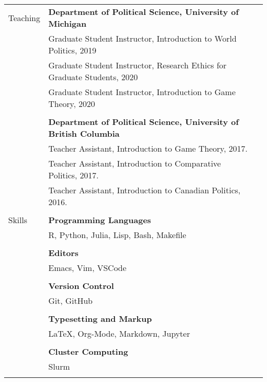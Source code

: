 \documentclass[letterpaper,11pt,oneside]{article}
\begin{document}
\begin{tabular}{@{} l l l}
  \Large{Teaching}
                      & \textbf{Department of Political Science, University of Michigan} \\
                      & Graduate Student Instructor, Introduction to World Politics, 2019 \\
                      & Graduate Student Instructor, Research Ethics for Graduate Students, 2020 \\
                      & Graduate Student Instructor, Introduction to Game Theory, 2020 \\
  \\
                      & \textbf{Department of Political Science, University of British Columbia} \\
                      & Teacher Assistant, Introduction to Game Theory, 2017. \\
                      & Teacher Assistant, Introduction to Comparative Politics, 2017. \\
                      & Teacher Assistant, Introduction to Canadian Politics, 2016. \\
                      & \\
  \Large{Skills}
                      & \textbf{Programming Languages} \\
                      & R, Python, Julia, Lisp, Bash, Makefile \\
  \\
                      & \textbf{Editors} \\
                      & Emacs, Vim, VSCode \\
  \\
                      & \textbf{Version Control} \\
                      & Git, GitHub \\
  \\
                      & \textbf{Typesetting and Markup} \\
                      & \LaTeX, Org-Mode, Markdown, Jupyter \\
  \\
                      & \textbf{Cluster Computing} \\
                      & Slurm \\
  \\

\end{tabular}

\vspace{2em}
\end{document}
